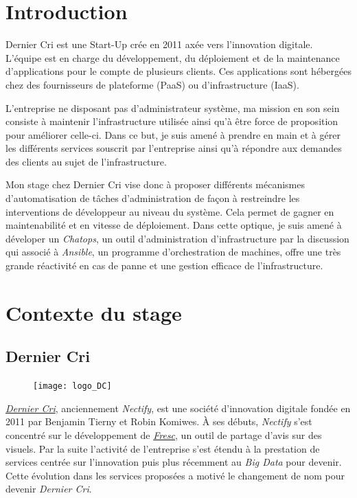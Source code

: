 \newpage

\section{Introduction}\label{introduction}

\bigskip

Dernier Cri est une Start-Up crée en 2011 axée vers l'innovation
digitale. L'équipe est en charge du développement, du déploiement et de
la maintenance d'applications pour le compte de plusieurs clients. Ces
applications sont hébergées chez des fournisseurs de plateforme (PaaS)
ou d'infrastructure (IaaS).

\bigskip

L'entreprise ne disposant pas d'administrateur système, ma mission en
son sein consiste à maintenir l'infrastructure utilisée ainsi qu'à être
force de proposition pour améliorer celle-ci. Dans ce but, je suis amené
à prendre en main et à gérer les différents services souscrit par
l'entreprise ainsi qu'à répondre aux demandes des clients au sujet de
l'infrastructure.

\bigskip

Mon stage chez Dernier Cri vise donc à proposer différents mécanismes
d'automatisation de tâches d'administration de façon à restreindre les
interventions de développeur au niveau du système. Cela permet de gagner
en maintenabilité et en vitesse de déploiement. Dans cette optique, je
suis amené à déveloper un \emph{Chatops}, un outil d'administration
d'infrastructure par la discussion qui associé à \emph{Ansible}, un
programme d'orchestration de machines, offre une très grande réactivité
en cas de panne et une gestion efficace de l'infrastructure.

\newpage

\section{Contexte du stage}\label{contexte-du-stage}

\subsection{Dernier Cri}\label{dernier-cri}

\begin{figure}[htbp]
\centering
\texttt{[image: logo\_DC]}
\caption{}
\end{figure}

\emph{\href{http://derniercri.io}{Dernier Cri}}, anciennement
\emph{Nectify}, est une société d'innovation digitale fondée en 2011 par
Benjamin Tierny et Robin Komiwes. À ses débuts, \emph{Nectify} s'est
concentré sur le développement de \emph{\href{http://fre.sc}{Fresc}}, un
outil de partage d'avis sur des visuels. Par la suite l'activité de
l'entreprise s'est étendu à la prestation de services centrée sur
l'innovation puis plus récemment au \emph{Big Data} pour devenir. Cette
évolution dans les services proposées a motivé le changement de nom pour
devenir \emph{Dernier Cri}.

